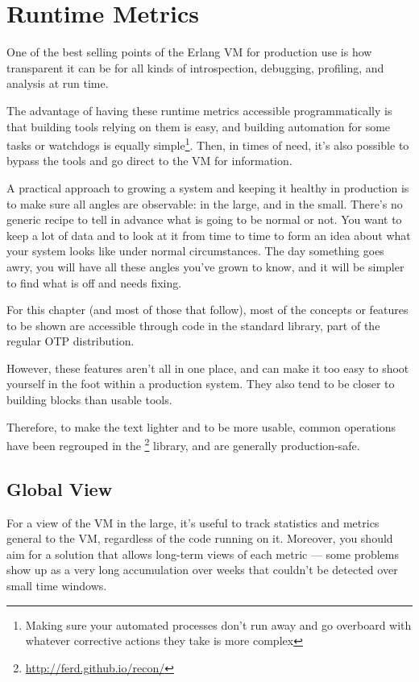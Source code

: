 \documentclass[11pt, oneside]{book}   	%
\begin{document}
\chapter{Runtime Metrics}
\label{chap:runtime-metrics}

One of the best selling points of the Erlang VM for production use is how transparent it can be for all kinds of introspection, debugging, profiling, and analysis at run time.

The advantage of having these runtime metrics accessible programmatically is that building tools relying on them is easy, and building automation for some tasks or watchdogs is equally simple\footnote{Making sure your automated processes don't run away and go overboard with whatever corrective actions they take is more complex}. Then, in times of need, it's also possible to bypass the tools and go direct to the VM for information.

A practical approach to growing a system and keeping it healthy in production is to make sure all angles are observable: in the large, and in the small. There's no generic recipe to tell in advance what is going to be normal or not. You want to keep a lot of data and to look at it from time to time to form an idea about what your system looks like under normal circumstances. The day something goes awry, you will have all these angles you've grown to know, and it will be simpler to find what is off and needs fixing.

For this chapter (and most of those that follow), most of the concepts or features to be shown are accessible through code in the standard library, part of the regular OTP distribution. 

However, these features aren't all in one place, and can make it too easy to shoot yourself in the foot within a production system. They also tend to be closer to building blocks than usable tools.

Therefore, to make the text lighter and to be more usable, common operations have been regrouped in the \footnote{\href{http://ferd.github.io/recon/}{http://ferd.github.io/recon/}} library, and are generally production-safe.

\section{Global View}
\label{sec:global-view}

For a view of the VM in the large, it's useful to track statistics and metrics general to the VM, regardless of the code running on it. Moreover, you should aim for a solution that allows long-term views of each metric — some problems show up as a very long accumulation over weeks that couldn't be detected over small time windows.
\end{document}
